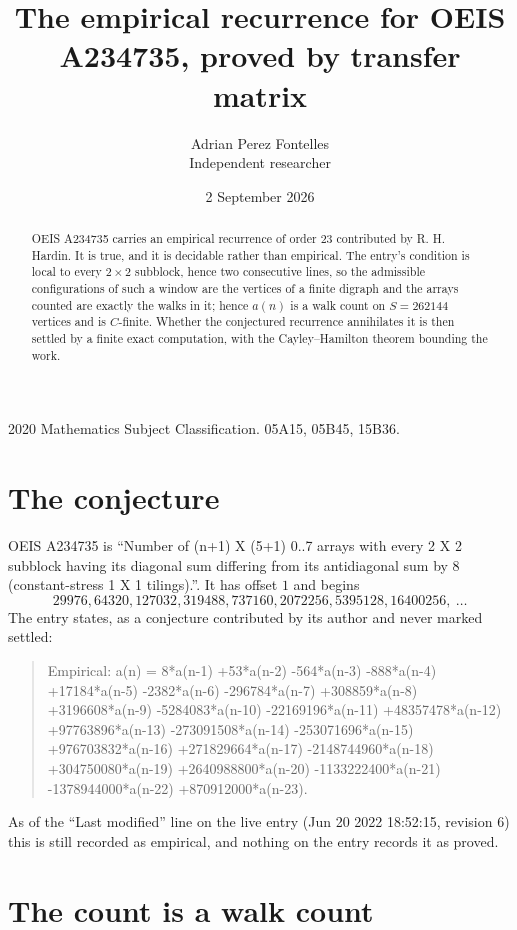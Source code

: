 \documentclass[11pt,a4paper]{article}
\title{The empirical recurrence for OEIS A234735, proved by transfer matrix}
\author{Adrian Perez Fontelles\\ \small Independent researcher}
\date{2 September 2026}
\theoremstyle{plain}
\theoremstyle{definition}
\begin{document}
\maketitle

\begin{abstract}
OEIS A234735 carries an empirical recurrence of order $23$ contributed by R. H. Hardin. It is
true, and it is decidable rather than empirical. The entry's condition is local to every $2\times2$ subblock, hence two consecutive lines, so
the admissible configurations of such a window are the vertices of a finite digraph and the
arrays counted are exactly the walks in it; hence $a(n)$ is a walk count on $S=262144$ vertices
and is $C$-finite. Whether the conjectured recurrence annihilates it is then settled by a
finite exact computation, with the Cayley--Hamilton theorem bounding the work.
\end{abstract}

\noindent\small 2020 Mathematics Subject Classification. 05A15, 05B45, 15B36.\normalsize

\section{The conjecture}

OEIS A234735 is ``Number of (n+1) X (5+1) 0..7 arrays with every 2 X 2 subblock having its diagonal sum differing from its antidiagonal sum by 8 (constant-stress 1 X 1 tilings).''. It has offset $1$ and begins
\[
29976, 64320, 127032, 319488, 737160, 2072256, 5395128, 16400256,\ \dots
\]
The entry states, as a conjecture contributed by its author and never marked settled:
\begin{quote}
Empirical: a(n) = 8*a(n-1) +53*a(n-2) -564*a(n-3) -888*a(n-4) +17184*a(n-5) -2382*a(n-6) -296784*a(n-7) +308859*a(n-8) +3196608*a(n-9) -5284083*a(n-10) -22169196*a(n-11) +48357478*a(n-12) +97763896*a(n-13) -273091508*a(n-14) -253071696*a(n-15) +976703832*a(n-16) +271829664*a(n-17) -2148744960*a(n-18) +304750080*a(n-19) +2640988800*a(n-20) -1133222400*a(n-21) -1378944000*a(n-22) +870912000*a(n-23).
\end{quote}
As of the ``Last modified'' line on the live entry (Jun 20 2022 18:52:15, revision 6) this is still
recorded as empirical, and nothing on the entry records it as proved.

\section{The count is a walk count}
\end{document}
